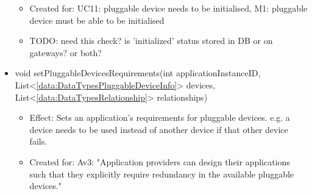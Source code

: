 \begin{description}
\begin{itemize}[noitemsep,nolistsep,leftmargin=-.25cm]
\begin{itemize}[noitemsep,nolistsep]
\item Created for: UC11: pluggable device needs to be initialised, M1: pluggable device must be able to be initialised
\item TODO: need this check? is 'initialized' status stored in DB or on gateways? or both?
        \end{itemize}
      \item \textsf{void setPluggableDevicesRequirements(int applicationInstanceID, List\textless{}\ref{data:DataTypesPluggableDeviceInfo}\textgreater{} devices, List\textless{}\ref{data:DataTypesRelationship}\textgreater{} relationships)}
        \begin{itemize}[noitemsep,nolistsep]
           \item Effect: Sets an application's requirements for pluggable devices. e.g. a device needs to be used instead of another device if that other device fails.
\item Created for: Av3: "Application providers can design their applications such that they explicitly require redundancy in the available pluggable devices."
        \end{itemize}
    \end{itemize}
    \end{description}

